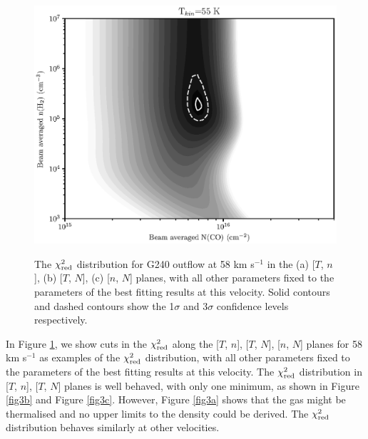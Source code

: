 \begin{figure}[tbp]
{\begin{minipage}[b]{0.5\textwidth}
\includegraphics[width=1\textwidth]{./fig/chiimage_tkin_paper.eps}
\label{fig3c}
\end{minipage}
}
\caption{The $\chi_{\textup{red}}^2$ distribution for G240 outflow at 58 km s$^{-1}$ in the (a) [$T$, $n$], (b) [$T$, $N$], (c) [$n$, $N$] planes, with all other parameters fixed to the parameters of the best fitting results at this velocity. Solid contours and dashed contours show the 1$\sigma$ and 3$\sigma$ confidence levels respectively. \label{fig3}}
\end{figure}

In Figure \ref{fig3}, we show cuts in the $\chi_{\textup{red}}^2$ along the [$T$, $n$], [$T$, $N$], [$n$, $N$] planes for 58 km s$^{-1}$ as examples of the $\chi_{\textup{red}}^2$ distribution, with all other parameters fixed to  the parameters of the best fitting results at this velocity. The $\chi_{\textup{red}}^2$ distribution in [$T$, $n$], [$T$, $N$] planes is well behaved, with only one minimum, as shown in Figure \ref{fig3b} and Figure \ref{fig3c}. However, Figure \ref{fig3a} shows that the gas might be thermalised and no upper limits to the density could be derived. The $\chi_{\textup{red}}^2$ distribution behaves similarly at other velocities. 

